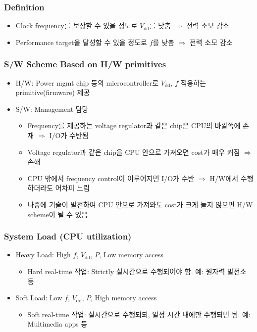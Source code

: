 \subsubsection*{Definition}
\begin{itemize}
    \item Clock frequency를 보장할 수 있을 정도로 $V_\mathrm{dd}$를 낮춤 $\Rightarrow$ 전력 소모 감소
    \item Performance target을 달성할 수 있을 정도로 $f$를 낮춤 $\Rightarrow$ 전력 소모 감소
\end{itemize}

\subsubsection*{S/W Scheme Based on H/W primitives}
\begin{itemize}
    \item H/W: Power mgmt chip 등의 microcontroller로 $V_{\mathrm{dd}}$, $f$ 적용하는 primitive(firmware) 제공
    \item S/W: Management 담당
    \begin{itemize}
        \item Frequency를 제공하는 voltage regulator과 같은 chip은 CPU의 바깥쪽에 존재 $\Rightarrow$ I/O가 수반됨
        \item Voltage regulator과 같은 chip을 CPU 안으로 가져오면 cost가 매우 커짐 $\Rightarrow$ 손해
        \item CPU 밖에서 frequency control이 이루어지면 I/O가 수반 $\Rightarrow$ H/W에서 수행하더라도 어차피 느림
        \item 나중에 기술이 발전하여 CPU 안으로 가져와도 cost가 크게 늘지 않으면 H/W scheme이 될 수 있음
    \end{itemize}
\end{itemize}

\subsubsection*{System Load (CPU utilization)}
\begin{itemize}
    \item Heavy Load: High $f$, $V_{\mathrm{dd}}$, $P$, Low memory access
    \begin{itemize}
        \item Hard real-time 작업: Strictly 실시간으로 수행되어야 함. 예: 원자력 발전소 등
    \end{itemize}
    \item Soft Load: Low $f$, $V_{\mathrm{dd}}$, $P$, High memory access
    \begin{itemize}
        \item Soft real-time 작업: 실시간으로 수행되되, 일정 시간 내에만 수행되면 됨. 예: Multimedia apps 등
    \end{itemize}
\end{itemize}

